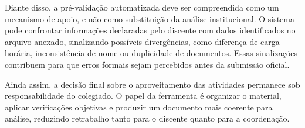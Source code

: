 Diante disso, a pré-validação automatizada deve ser compreendida como um mecanismo de apoio, e não como substituição da análise institucional. O sistema pode confrontar informações declaradas pelo discente com dados identificados no arquivo anexado, sinalizando possíveis divergências, como diferença de carga horária, inconsistência de nome ou duplicidade de documentos. Essas sinalizações contribuem para que erros formais sejam percebidos antes da submissão oficial.

Ainda assim, a decisão final sobre o aproveitamento das atividades permanece sob responsabilidade do colegiado. O papel da ferramenta é organizar o material, aplicar verificações objetivas e produzir um documento mais coerente para análise, reduzindo retrabalho tanto para o discente quanto para a coordenação.

